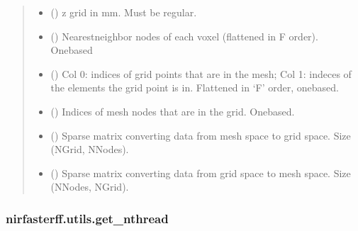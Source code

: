 \documentclass[letterpaper,10pt,english]{sphinxmanual}
\begin{document}
\begin{fulllineitems}
\begin{quote}
\begin{description}
\begin{itemize}
\item {} 
\sphinxAtStartPar
{} (\sphinxstyleliteralemphasis{\sphinxupquote{{[}}}\sphinxstyleliteralemphasis{\sphinxupquote{{]} }}) \textendash{} z grid in mm. Must be regular.

\end{itemize}

\sphinxAtStartPar
\begin{itemize}
\item {} 
\sphinxAtStartPar
{} () \textendash{} Nearest\sphinxhyphen{}neighbor nodes of each voxel (flattened in F order). One\sphinxhyphen{}based

\item {} 
\sphinxAtStartPar
{} () \textendash{} Col 0: indices of grid points that are in the mesh; Col 1: indeces of the elements the grid point is in. Flattened in ‘F’ order, one\sphinxhyphen{}based.

\item {} 
\sphinxAtStartPar
{} () \textendash{} Indices of mesh nodes that are in the grid. One\sphinxhyphen{}based.

\item {} 
\sphinxAtStartPar
{} () \textendash{} Sparse matrix converting data from mesh space to grid space. Size (NGrid, NNodes).

\item {} 
\sphinxAtStartPar
{} () \textendash{} Sparse matrix converting data from grid space to mesh space. Size (NNodes, NGrid).

\end{itemize}


\end{description}\end{quote}

\end{fulllineitems}


\sphinxstepscope


\subsubsection{nirfasterff.utils.get\_nthread}
\label{\detokenize{_autosummary/nirfasterff.utils.get_nthread:nirfasterff-utils-get-nthread}}\label{\detokenize{_autosummary/nirfasterff.utils.get_nthread::doc}}
\end{document}
